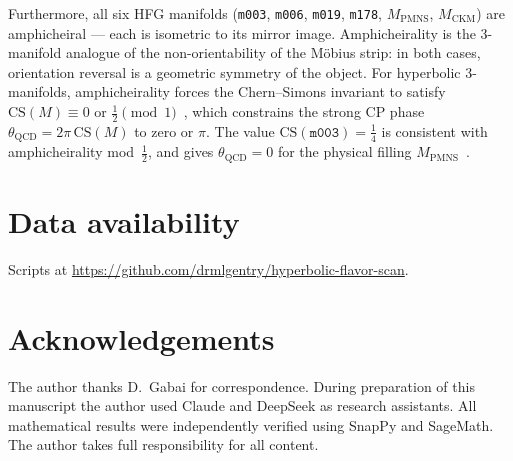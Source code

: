 \documentclass[11pt,a4paper]{article}
\theoremstyle{definition}
\theoremstyle{remark}
\newcommand{\mfld}[1]{\texttt{#1}}
\begin{document}
Furthermore, all six HFG manifolds (\mfld{m003}, \mfld{m006},
\mfld{m019}, \mfld{m178}, $M_{\mathrm{PMNS}}$, $M_{\mathrm{CKM}}$)
are amphicheiral --- each is isometric to its mirror image.
Amphicheirality is the 3-manifold analogue of the non-orientability
of the M\"obius strip: in both cases, orientation reversal is a
geometric symmetry of the object.
For hyperbolic 3-manifolds, amphicheirality forces the
Chern--Simons invariant to satisfy $\mathrm{CS}(M) \equiv 0$ or
$\tfrac{1}{2} \pmod{1}$~\cite{Kirk-Klassen}, which constrains
the strong CP phase $\theta_{\mathrm{QCD}} = 2\pi\,\mathrm{CS}(M)$
to zero or $\pi$.
The value $\mathrm{CS}(\mfld{m003}) = \tfrac{1}{4}$ is consistent
with amphicheirality mod~$\tfrac{1}{2}$, and gives
$\theta_{\mathrm{QCD}} = 0$ for the physical filling
$M_{\mathrm{PMNS}}$~\cite{GentryUnified}.

\section*{Data availability}
Scripts at \url{https://github.com/drmlgentry/hyperbolic-flavor-scan}.

\section*{Acknowledgements}
The author thanks D.~Gabai for correspondence.
During preparation of this manuscript the author used
Claude and DeepSeek as research assistants.
All mathematical results were independently verified using
SnapPy and SageMath.
The author takes full responsibility for all content.
\end{document}
